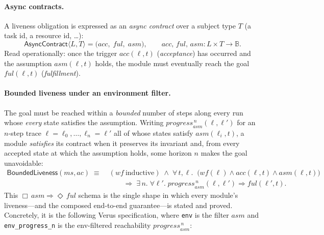 \documentclass[11pt]{article}
\theoremstyle{plain}
\theoremstyle{definition}
\begin{document}
\paragraph{Async contracts.}
A liveness obligation is expressed as an \emph{async contract} over a subject type
$T$ (a task id, a resource id, \dots):
\[
  \mathsf{AsyncContract}\langle L, T\rangle
  = \bigl(\mathit{acc},\; \mathit{ful},\; \mathit{asm}\bigr),
  \qquad \mathit{acc},\,\mathit{ful},\,\mathit{asm} : L \times T \to \mathbb{B}.
\]
Read operationally: once the trigger $\mathit{acc}(\ell,t)$ (\emph{acceptance}) has
occurred and the assumption $\mathit{asm}(\ell,t)$ holds, the module must eventually
reach the goal $\mathit{ful}(\ell,t)$ (\emph{fulfillment}).

\paragraph{Bounded liveness under an environment filter.}
The goal must be reached within a \emph{bounded} number of steps along every run
whose \emph{every} state satisfies the assumption. Writing
$\mathit{progress}^{\,n}_{\mathit{asm}}(\ell,\ell')$ for an $n$-step trace
$\ell=\ell_0,\dots,\ell_n=\ell'$ all of whose states satisfy $\mathit{asm}(\ell_i,t)$,
a module \emph{satisfies} its contract when it preserves its invariant and, from
every accepted state at which the assumption holds, some horizon $n$ makes the goal
unavoidable:
\[
\begin{aligned}
  \mathsf{BoundedLiveness}(\mathit{ms}, \mathit{ac}) \;\equiv\;{}
    & (\mathit{wf}\ \text{inductive}) \;\wedge\;
      \forall\, t, \ell.\;\;
      \bigl(\mathit{wf}(\ell) \wedge \mathit{acc}(\ell,t) \wedge \mathit{asm}(\ell,t)\bigr) \\
    & \qquad {}\Rightarrow\;
      \exists\, n.\;\forall \ell'.\;
      \mathit{progress}^{\,n}_{\mathit{asm}}(\ell,\ell') \Rightarrow \mathit{ful}(\ell',t).
\end{aligned}
\]
This $\Box\,\mathit{asm} \Rightarrow \Diamond\,\mathit{ful}$ schema is the single shape
in which every module's liveness---and the composed end-to-end guarantee---is stated
and proved. Concretely, it is the following Verus specification, where
\lstinline|env| is the filter $\mathit{asm}$ and \lstinline|env_progress_n| is the
env-filtered reachability $\mathit{progress}^{\,n}_{\mathit{asm}}$:
\end{document}
